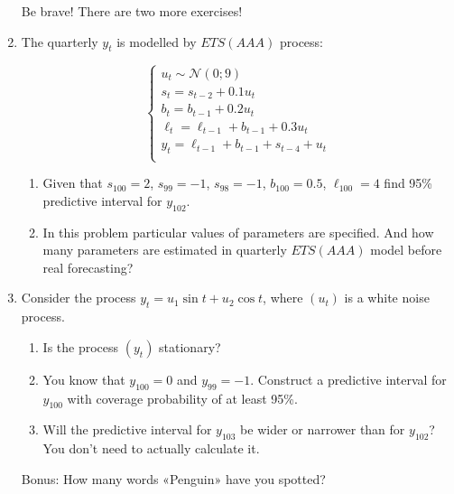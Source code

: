 \documentclass[12pt]{article}
\newcommand{\cN}{\mathcal{N}}
\begin{document}
\begin{enumerate}
    Be brave! There are two more exercises!
    \newpage

    \item The quarterly $y_t$ is modelled by $ETS(AAA)$ process:
    
    \[
    \begin{cases}
        u_t \sim \cN(0; 9) \\
        s_t = s_{t-2} + 0.1 u_t \\
        b_t = b_{t-1} + 0.2 u_t \\
        \ell_t = \ell_{t-1} + b_{t-1} + 0.3 u_t \\
        y_t = \ell_{t-1} + b_{t-1} + s_{t-4} + u_t \\
    \end{cases}    
    \]

    \begin{enumerate}
        \item Given that $s_{100} = 2$, $s_{99} = -1$, $s_{98}=-1$, $b_{100} = 0.5$, $\ell_{100} = 4$ find 95\% predictive interval for $y_{102}$. 
        \item In this problem particular values of parameters are specified. And how many parameters are estimated in quarterly $ETS(AAA)$ model before real forecasting?
    \end{enumerate}

    \item Consider the process $y_t = u_1 \sin t + u_2 \cos t$, where $(u_t)$ is a white noise process.
    \begin{enumerate}
        \item Is the process $(y_t)$ stationary?
        \item You know that $y_{100} = 0$ and $y_{99}=-1$. Construct a predictive interval for $y_{100}$ with coverage probability of at least 95\%. 
        \item Will the predictive interval for $y_{103}$ be wider or narrower than for $y_{102}$? You don't need to actually calculate it. 
    \end{enumerate}
    
    \item[Bonus:] How many words «Penguin» have you spotted?
    
 
\end{enumerate}
\end{document}
